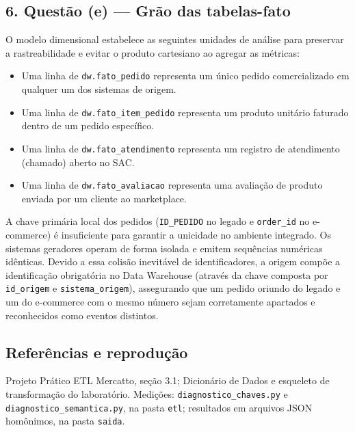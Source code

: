 \documentclass[11pt,a4paper]{article}
\providecommand{\tightlist}{\setlength{\itemsep}{0pt}\setlength{\parskip}{0pt}}
\begin{document}
\subsection{6. Questão (e) --- Grão das
tabelas-fato}\label{questuxe3o-e-gruxe3o-das-tabelas-fato}

O modelo dimensional estabelece as seguintes unidades de análise para preservar a rastreabilidade e evitar o produto cartesiano ao agregar as métricas:

\begin{itemize}
\tightlist
\item
  Uma linha de \texttt{dw.fato\_pedido} representa um único pedido comercializado em qualquer um dos sistemas de origem.
\item
  Uma linha de \texttt{dw.fato\_item\_pedido} representa um produto unitário faturado dentro de um pedido específico.
\item
  Uma linha de \texttt{dw.fato\_atendimento} representa um registro de atendimento (chamado) aberto no SAC.
\item
  Uma linha de \texttt{dw.fato\_avaliacao} representa uma avaliação de produto enviada por um cliente ao marketplace.
\end{itemize}

A chave primária local dos pedidos (\texttt{ID\_PEDIDO} no legado e \texttt{order\_id} no e-commerce) é insuficiente para garantir a unicidade no ambiente integrado. Os sistemas geradores operam de forma isolada e emitem sequências numéricas idênticas. Devido a essa colisão inevitável de identificadores, a origem compõe a identificação obrigatória no Data Warehouse (através da chave composta por \texttt{id\_origem} e \texttt{sistema\_origem}), assegurando que um pedido oriundo do legado e um do e-commerce com o mesmo número sejam corretamente apartados e reconhecidos como eventos distintos.

\subsection{Referências e
reprodução}\label{referuxeancias-e-reproduuxe7uxe3o}

Projeto Prático ETL Mercatto, seção 3.1; Dicionário de Dados e esqueleto
de transformação do laboratório. Medições:
\texttt{diagnostico\_chaves.py} e \texttt{diagnostico\_semantica.py}, na
pasta \texttt{etl}; resultados em arquivos JSON homônimos, na pasta
\texttt{saida}.
\end{document}

